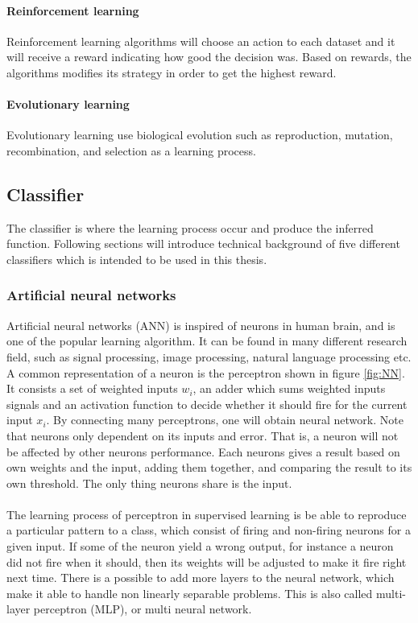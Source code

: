 \documentclass[USenglish]{ifimaster}  %
\begin{document}
\paragraph{Reinforcement learning}
Reinforcement learning algorithms will choose an action to each dataset and it will receive a reward indicating how good the decision was. Based on rewards, the algorithms modifies its strategy in order to get the highest reward. 
	
\paragraph{Evolutionary learning}
Evolutionary learning use biological evolution such as reproduction, mutation, recombination, and selection as a learning process. 
	
\subsection{Classifier} \label{sub:classifier}
The classifier is where the learning process occur and produce the inferred function. Following sections will introduce technical background of five different classifiers which is intended to be used in this thesis.
	
\subsubsection{Artificial neural networks}
Artificial neural networks (ANN) is inspired of neurons in human brain, and is one of the popular learning algorithm. It can be found in many different research field, such as signal processing, image processing, natural language processing etc. A common representation of a neuron is the perceptron shown in figure \ref{fig:NN}. It consists a set of weighted inputs $w_i$, an adder which sums weighted inputs signals and an activation function to decide whether it should fire for the current input $x_i$. By connecting many perceptrons, one will obtain neural network. Note that neurons only dependent on its inputs and error. That is, a neuron will not be affected by other neurons performance. Each neurons gives a result based on own weights and the input, adding them together, and comparing the result to its own threshold. The only thing neurons share is the input. 
\\
\\
The learning process of perceptron in supervised learning is be able to reproduce a particular pattern to a class, which consist of firing and non-firing neurons for a given input. If some of the neuron yield a wrong output, for instance a neuron did not fire when it should, then its weights will be adjusted to make it fire right next time. There is a possible to add more layers to the neural network, which make it able to handle non linearly separable problems. This is also called multi-layer perceptron (MLP), or multi neural network.
\end{document}
